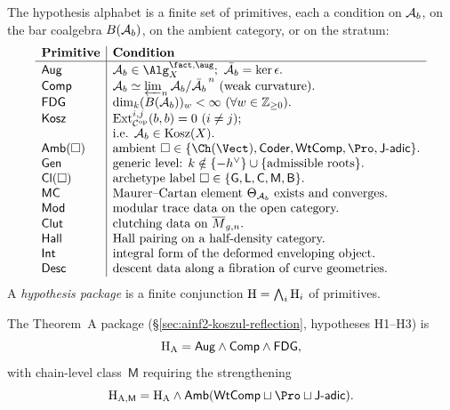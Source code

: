 \begin{definition}
\label{def:type-hypotheses}
The hypothesis alphabet is a finite set of primitives, each a
condition on $\mathcal{A}_b$, on the bar coalgebra $B(\mathcal{A}_b)$, on the ambient
category, or on the stratum:
\[
\begin{array}{l|l}
\textbf{Primitive} & \textbf{Condition} \\
\hline
\HypAug & \Ab\in\Alg^{\fact,\aug}_X;\ \bar\Ab=\ker\epsilon. \\
\HypComp & \Ab\simeq\varprojlim_n\Ab/\bar\Ab^{\,n}\text{ (weak curvature).} \\
\HypFinDimGr & \dim_k(B(\Ab))_w<\infty\ (\forall w\in\mathbb Z_{\geq 0}). \\
\HypKosz & \mathrm{Ext}^{i,j}_{\mathcal C^{\mathrm{op}}}(b,b)=0\ (i\neq j); \\
       & \text{i.e. }\Ab\in\mathrm{Kosz}(X). \\
\HypAmb(\square) & \text{ambient }\square\in\{\Ch(\Vect),\HypCoder,\HypWtComp,\Pro,\HypJad\}. \\
\HypGen & \text{generic level: }k\notin\{-h^\vee\}\cup\{\text{admissible roots}\}. \\
\HypClass(\square) & \text{archetype label }\square\in\{\mathsf G,\mathsf L,\mathsf C,\mathsf M,\mathsf B\}. \\
\HypMC & \text{Maurer--Cartan element }\Theta_{\Ab}\text{ exists and converges.} \\
\HypMod & \text{modular trace data on the open category.} \\
\HypClut & \text{clutching data on }\overline{M}_{g,n}. \\
\HypHall & \text{Hall pairing on a half-density category.} \\
\HypIntegral & \text{integral form of the deformed enveloping object.} \\
\HypDescent & \text{descent data along a fibration of curve geometries.}
\end{array}
\]
A \emph{hypothesis package} is a finite conjunction
$\mathrm{H}=\bigwedge_i \mathrm{H}_i$ of primitives.
\end{definition}

\begin{example}
\label{ex:type-thmA-package}
The Theorem~A package (\S\ref{sec:ainf2-koszul-reflection}, hypotheses
H1--H3) is
\[
 \mathrm{H}_{\mathrm{A}}
 = \mathsf{Aug}\wedge\mathsf{Comp}\wedge\mathsf{FDG},
\]
with chain-level class~$\mathsf M$ requiring the strengthening
\[
 \Hyp_{\mathrm{A},\mathsf M}
 = \Hyp_{\mathrm{A}}\wedge\HypAmb(\HypWtComp\joinp\Pro\joinp\HypJad).
\]
\end{example}

